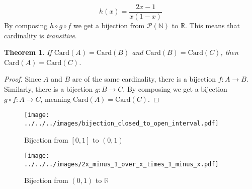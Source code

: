 \documentclass{article}
\theoremstyle{plain}
\newtheorem{theorem}{Theorem}[section]
\theoremstyle{normal}
\begin{document}
        \begin{equation}
            h(x)=\frac{2x-1}{x(1-x)}
        \end{equation}
        By composing $h\circ{g}\circ{f}$ we get a bijection from
        $\mathcal{P}(\mathbb{N})$ to $\mathbb{R}$. This means that cardinality
        is \textit{transitive}.
        \begin{theorem}
            If $\textrm{Card}(A)=\textrm{Card}(B)$ and
            $\textrm{Card}(B)=\textrm{Card}(C)$, then
            $\textrm{Card}(A)=\textrm{Card}(C)$.
        \end{theorem}
        \begin{proof}
            Since $A$ and $B$ are of the same cardinality, there is a
            bijection $f:A\rightarrow{B}$. Similarly, there is a bijection
            $g:B\rightarrow{C}$. By composing we get a bijection
            $g\circ{f}:A\rightarrow{C}$, meaning
            $\textrm{Card}(A)=\textrm{Card}(C)$.
        \end{proof}
        \begin{figure}
            \centering
            \texttt{[image: ../../../images/bijection\_closed\_to\_open\_interval.pdf]}
            \caption{Bijection from $[0,1]$ to $(0,1)$}
            \label{fig:bijection_closed_to_open_interval}
        \end{figure}
        \begin{figure}
            \centering
            \texttt{[image: ../../../images/2x\_minus\_1\_over\_x\_times\_1\_minus\_x.pdf]}
            \caption{Bijection from $(0,1)$ to $\mathbb{R}$}
            \label{fig:2x_minus_1_over_x_times_1_minus_x}
        \end{figure}
\end{document}
